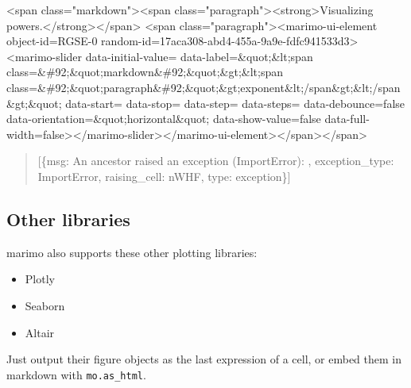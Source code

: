 \documentclass[
  letterpaper,
  DIV=11,
  numbers=noendperiod]{scrartcl}
\providecommand{\tightlist}{%
  \setlength{\itemsep}{0pt}\setlength{\parskip}{0pt}}\usepackage{longtable,booktabs,array}
\begin{document}
\textless span class="markdown"\textgreater\textless span
class="paragraph"\textgreater\textless strong\textgreater Visualizing
powers.\textless/strong\textgreater\textless/span\textgreater{}
\textless span class="paragraph"\textgreater\textless marimo-ui-element
object-id=\textquotesingle RGSE-0\textquotesingle{}
random-id=\textquotesingle17aca308-abd4-455a-9a9e-fdfc941533d3\textquotesingle\textgreater\textless marimo-slider
data-initial-value=\textquotesingle{}
data-label=\textquotesingle\&quot;\&lt;span
class=\&\#92;\&quot;markdown\&\#92;\&quot;\&gt;\&lt;span
class=\&\#92;\&quot;paragraph\&\#92;\&quot;\&gt;exponent\&lt;/span\&gt;\&lt;/span\&gt;\&quot;\textquotesingle{}
data-start=\textquotesingle{}
data-stop=\textquotesingle{}
data-step=\textquotesingle{}
data-steps=\textquotesingle{[}{]}\textquotesingle{}
data-debounce=\textquotesingle false\textquotesingle{}
data-orientation=\textquotesingle\&quot;horizontal\&quot;\textquotesingle{}
data-show-value=\textquotesingle false\textquotesingle{}
data-full-width=\textquotesingle false\textquotesingle\textgreater\textless/marimo-slider\textgreater\textless/marimo-ui-element\textgreater\textless/span\textgreater\textless/span\textgreater{}

\begin{quote}
{[}\{\textquotesingle msg\textquotesingle: \textquotesingle An ancestor
raised an exception (ImportError): \textquotesingle,
\textquotesingle exception\_type\textquotesingle:
\textquotesingle ImportError\textquotesingle,
\textquotesingle raising\_cell\textquotesingle:
\textquotesingle nWHF\textquotesingle,
\textquotesingle type\textquotesingle:
\textquotesingle exception\textquotesingle\}{]}
\end{quote}

\subsection{Other libraries}\label{other-libraries}

marimo also supports these other plotting libraries:

\begin{itemize}
\tightlist
\item
  Plotly
\item
  Seaborn
\item
  Altair
\end{itemize}

Just output their figure objects as the last expression of a cell, or
embed them in markdown with \texttt{mo.as\_html}.
\end{document}
